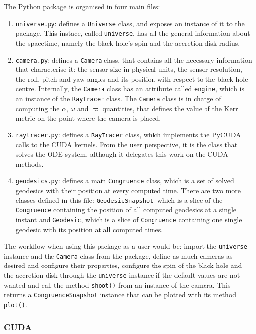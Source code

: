 The Python package is organised in four main files:
\begin{enumerate}
	\item \lstinline{universe.py}: defines a \lstinline{Universe} class, and exposes an instance of it to the package. This instace, called \lstinline{universe}, has all the general information about the spacetime, namely the black hole's spin and the accretion disk radius.
	\item \lstinline{camera.py}: defines a \lstinline{Camera} class, that contains all the necessary information that characterise it: the sensor size in physical units, the sensor resolution, the roll, pitch and yaw angles and its position with respect to the black hole centre. Internally, the \lstinline{Camera} class has an attribute called \lstinline{engine}, which is an instance of the \lstinline{RayTracer} class. The \lstinline{Camera} class is in charge of computing the $\alpha$, $\omega$ and $\varpi$ quantities, that defines the value of the Kerr metric on the point where the camera is placed.
	\item \lstinline{raytracer.py}: defines a \lstinline{RayTracer} class, which implements the PyCUDA calls to the \ac{CUDA} kernels. From the user perspective, it is the class that solves the \ac{ODE} system, although it delegates this work on the \ac{CUDA} methods.
	\item \lstinline{geodesics.py}: defines a main \lstinline{Congruence} class, which is a set of solved geodesics with their position at every computed time. There are two more classes defined in this file: \lstinline{GeodesicSnapshot}, which is a slice of the \lstinline{Congruence} containing the position of all computed geodesics at a single instant and \lstinline{Geodesic}, which is a slice of \lstinline{Congruence} containing one single geodesic with its position at all computed times.
\end{enumerate}

The workflow when using this package as a user would be: import the \lstinline{universe} instance and the \lstinline{Camera} class from the package, define as much cameras as desired and configure their properties, configure the spin of the black hole and the accretion disk through the \lstinline{universe} instance if the default values are not wanted and call the method \lstinline{shoot()} from an instance of the camera. This returns a \lstinline{CongruenceSnapshot} instance that can be plotted with its method \lstinline{plot()}.

\subsubsection*{CUDA}


